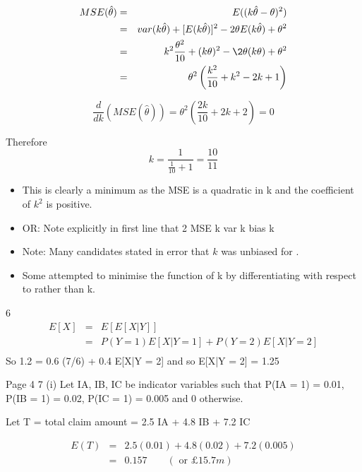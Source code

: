 \documentclass[a4paper,12pt]{article}
\begin{document}
\begin{eqnarray*}
MSE(  \hat{\theta}) &=& E((  k\hat{\theta} - \theta )^2) \\
&=& var( k\hat{\theta} ) + [E( k\hat{\theta})]^2 -  2\theta E( k \hat{\theta} ) +  \theta^2 \\
&=& k^2 \frac{\theta^2}{10} + (k\theta)^2 - \2 \theta (k \theta) + \theta^2 \\
&=& \theta^2 \left(  \frac{k^2}{10} + k^2 - 2k +1 \right) \\
\end{eqnarray*}

\[\frac{d}{dk} \left(MSE(  \hat{\theta})  \right) =   \theta^2 \left(  \frac{2k}{10} + 2k +2 \right) =0 \]

Therefore
\[k = \frac{1}{\frac{1}{10}+1} = \frac{10}{11}\]


\begin{itemize}
\item This is clearly a minimum as the MSE is a quadratic in k and the coefficient of $k^2$ is
positive.
\item OR: Note explicitly in first line that 2 MSE k var k bias k
\item Note: Many candidates stated in error that $k$ was unbiased for . 
\item Some attempted to minimise the function of k by differentiating with respect to rather than k.
\end{itemize}

6 
\begin{eqnarray*} E[X] &=& E[E[X|Y]] \\ &=& P(Y = 1) E[X|Y = 1] + P(Y = 2) E[X|Y = 2]\\
\end{eqnarray*}
So 1.2 = 0.6 (7/6) + 0.4 E[X|Y = 2] and so E[X|Y = 2] = 1.25

Page 4
7 (i) Let IA, IB, IC be indicator variables such that
P(IA = 1) = 0.01, P(IB = 1) = 0.02, P(IC = 1) = 0.005 and 0 otherwise.

Let T = total claim amount = 2.5 IA + 4.8 IB + 7.2 IC

\begin{eqnarray*}
E(T) &=& 2.5(0.01) + 4.8(0.02) + 7.2(0.005) \\ 
&=& 0.157 \qquad (\mbox{ or } £15.7m) \\
\end{eqnarray*}
\end{document}
